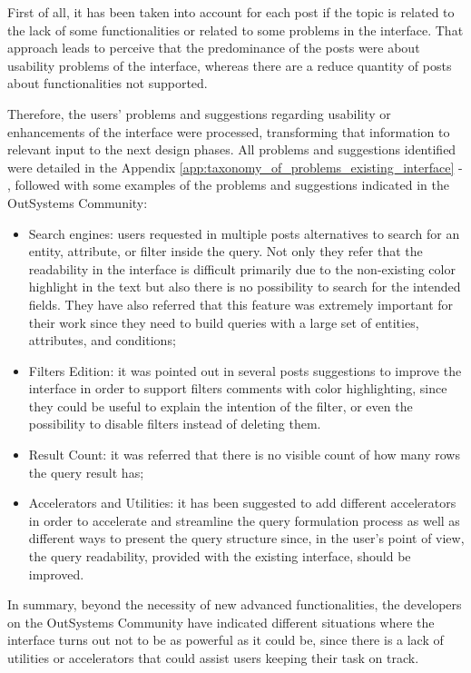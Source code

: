 First of all, it has been taken into account for each post if the topic is related to the lack of some functionalities or related to some problems in the interface. That approach leads to perceive that the predominance of the posts were about usability problems of the interface, whereas there are a reduce quantity of posts about functionalities not supported.

Therefore, the users’ problems and suggestions regarding usability or enhancements of the interface were processed, transforming that information to relevant input to the next design phases. All problems and suggestions identified were detailed in the Appendix \ref{app:taxonomy_of_problems_existing_interface} - , followed with some examples of the problems and suggestions indicated in the OutSystems Community:

\begin{itemize}
    \item Search engines: users requested in multiple posts alternatives to search for an entity, attribute, or filter inside the query. Not only they refer that the readability in the interface is difficult primarily due to the non-existing color highlight in the text but also there is no possibility to search for the intended fields. They have also referred that this feature was extremely important for their work since they need to build queries with a large set of entities, attributes, and conditions;
    \item Filters Edition: it was pointed out in several posts suggestions to improve the interface in order to support filters comments with color highlighting, since they could be useful to explain the intention of the filter, or even the possibility to disable filters instead of deleting them.  
    \item Result Count: it was referred that there is no visible count of how many rows the query result has;
    \item Accelerators and Utilities: it has been suggested to add different accelerators in order to accelerate and streamline the query formulation process as well as different ways to present the query structure since, in the user's point of view, the query readability, provided with the existing interface, should be improved.
\end{itemize}

In summary, beyond the necessity of new advanced functionalities, the developers on the OutSystems Community have indicated different situations where the interface turns out not to be as powerful as it could be, since there is a lack of utilities or accelerators that could assist users keeping their task on track.

